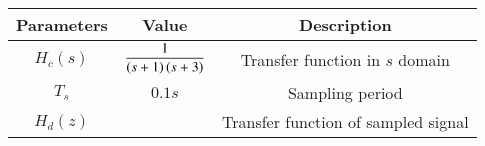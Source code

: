 \begin{tabular}{|c|c|c|}
\hline
\textbf{Parameters} & \textbf{Value} & \textbf{Description}\\
\hline
$H_c(s)$ & $\dfrac{1}{\left(s+1\right)\left(s+3\right)}$ & Transfer function in $s$ domain\\
\hline
$T_s$ & $0.1s$ & Sampling period\\
\hline
$H_d(z)$ & & Transfer function of sampled signal\\
\hline
\end{tabular}

